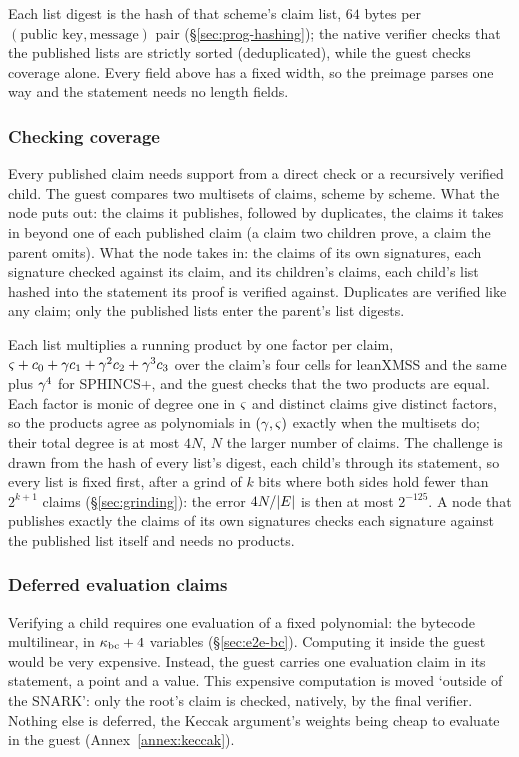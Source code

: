 Each list digest is the hash of that scheme's claim list, $64$ bytes per $(\text{public key},\text{message})$ pair (\S\ref{sec:prog-hashing}); the native verifier checks that the published lists are strictly sorted (deduplicated), while the guest checks coverage alone. Every field above has a fixed width, so the preimage parses one way and the statement needs no length fields.

\subsubsection{Checking coverage}

Every published claim needs support from a direct check or a recursively verified child. The guest compares two multisets of claims, scheme by scheme. What the node puts out: the claims it publishes, followed by duplicates, the claims it takes in beyond one of each published claim (a claim two children prove, a claim the parent omits). What the node takes in: the claims of its own signatures, each signature checked against its claim, and its children's claims, each child's list hashed into the statement its proof is verified against. Duplicates are verified like any claim; only the published lists enter the parent's list digests.

Each list multiplies a running product by one factor per claim, $\varsigma+c_0+\gamma c_1+\gamma^2c_2+\gamma^3c_3$ over the claim's four cells for leanXMSS and the same plus $\gamma^4$ for SPHINCS+, and the guest checks that the two products are equal. Each factor is monic of degree one in $\varsigma$ and distinct claims give distinct factors, so the products agree as polynomials in $(\gamma,\varsigma)$ exactly when the multisets do; their total degree is at most $4N$, $N$ the larger number of claims. The challenge is drawn from the hash of every list's digest, each child's through its statement, so every list is fixed first, after a grind of $k$ bits where both sides hold fewer than $2^{k+1}$ claims (\S\ref{sec:grinding}): the error $4N/|E|$ is then at most $2^{-125}$. A node that publishes exactly the claims of its own signatures checks each signature against the published list itself and needs no products.

\subsubsection{Deferred evaluation claims}\label{sec:deferred-claims}

Verifying a child requires one evaluation of a fixed polynomial: the bytecode multilinear, in $\kappa_{\mathrm{bc}}+4$ variables (\S\ref{sec:e2e-bc}). Computing it inside the guest would be very expensive. Instead, the guest carries one evaluation claim in its statement, a point and a value. This expensive computation is moved `outside of the SNARK': only the root's claim is checked, natively, by the final verifier. Nothing else is deferred, the Keccak argument's weights being cheap to evaluate in the guest (Annex~\ref{annex:keccak}).

